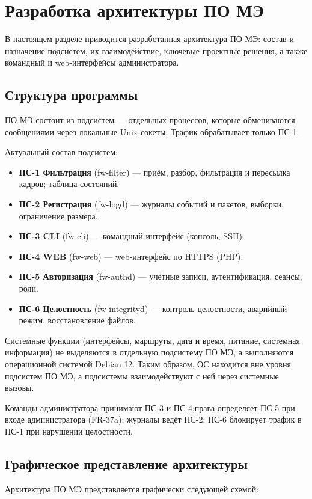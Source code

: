 \documentclass[13pt,a4paper,final]{article}
\begin{document}
	
	\section{Разработка архитектуры ПО МЭ}
	В настоящем разделе приводится разработанная архитектура ПО МЭ: состав и назначение подсистем, их взаимодействие, ключевые проектные решения, а также командный и web-интерфейсы администратора.
	\subsection{Структура программы}
	
	ПО МЭ состоит из подсистем — отдельных процессов, которые обмениваются сообщениями через локальные Unix-сокеты. Трафик обрабатывает только ПС-1.
	
	Актуальный состав подсистем:
	\begin{itemize}
		\item \textbf{ПС-1 Фильтрация} (fw-filter) — приём, разбор, фильтрация и пересылка кадров; таблица состояний.
		\item \textbf{ПС-2 Регистрация} (fw-logd) — журналы событий и пакетов, выборки, ограничение размера.
		\item \textbf{ПС-3 CLI} (fw-cli) — командный интерфейс (консоль, SSH).
		\item \textbf{ПС-4 WEB} (fw-web) — web-интерфейс по HTTPS (PHP).
		\item \textbf{ПС-5 Авторизация} (fw-authd) — учётные записи, аутентификация, сеансы, роли.
		\item \textbf{ПС-6 Целостность} (fw-integrityd) — контроль целостности, аварийный режим, восстановление файлов.
	\end{itemize}
	
	Системные функции (интерфейсы, маршруты, дата и время, питание, системная информация) не выделяются в отдельную подсистему ПО МЭ, а выполняются операционной системой Debian 12. Таким образом, ОС находится вне уровня подсистем ПО МЭ, а подсистемы взаимодействуют с ней через системные вызовы.
	
	Команды администратора принимают ПС-3 и ПС-4;{права определяет ПС-5 при входе администратора (FR-37a)}; журналы ведёт ПС-2; ПС-6 блокирует трафик в ПС-1 при нарушении целостности.
	
	
	\subsection{Графическое представление архитектуры}
	Архитектура ПО МЭ представляется графически следующей схемой:
\end{document}
